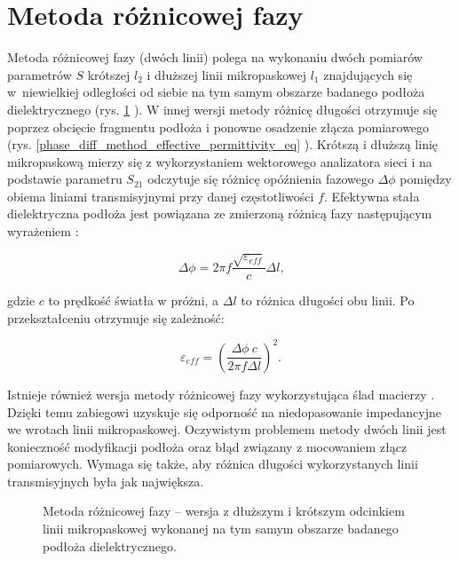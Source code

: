 \section{Metoda różnicowej fazy}

Metoda różnicowej fazy (dwóch linii) \cite{cite:two_lines_method} polega na wykonaniu dwóch pomiarów parametrów $S$ krótszej $l_2$ i dłuższej linii mikropaskowej $l_1$ znajdujących się w~niewielkiej odległości od siebie na tym samym obszarze badanego podłoża dielektrycznego (rys. \ref{fig:phase_difference_method_main} \cite{cite:doktorat}). W innej wersji metody różnicę długości otrzymuje się poprzez obcięcie fragmentu podłoża i ponowne osadzenie złącza pomiarowego (rys. \ref{phase_diff_method_effective_permittivity_eq} \cite{cite:doktorat}). Krótszą i dłuższą linię mikropaskową mierzy się z wykorzystaniem wektorowego analizatora sieci i na podstawie parametru $S_{21}$ odczytuje się różnicę opóźnienia fazowego $\Delta\phi$ pomiędzy obiema liniami transmisyjnymi przy danej częstotliwości $f$. Efektywna stała dielektryczna podłoża jest powiązana ze zmierzoną różnicą fazy następującym wyrażeniem \cite{cite:two_lines_method}:

 \begin{equation}
        \Delta\phi = 2\pi f\frac{\sqrt{\varepsilon_{eff}}}{c}\Delta l \text{,}
 \end{equation}
 
\noindent gdzie $c$ to prędkość światła w próżni, a $\Delta l$ to różnica długości obu linii. Po przekształceniu otrzymuje się zależność:

 \begin{equation}
\label{phase_diff_method_effective_permittivity_eq}
 \varepsilon_{eff} = \left( \frac{\Delta \phi \: c}{2 \pi f \Delta l} \right) ^2 \text{.}
 \end{equation}

Istnieje również wersja metody różnicowej fazy wykorzystująca ślad macierzy \cite{cite:two_lines_method_trace}. Dzięki temu zabiegowi uzyskuje się odporność na niedopasowanie impedancyjne we wrotach linii mikropaskowej. Oczywistym problemem metody dwóch linii jest konieczność modyfikacji podłoża oraz błąd związany z mocowaniem złącz pomiarowych. Wymaga się także, aby różnica długości wykorzystanych linii transmisyjnych była jak największa.

 \begin{figure}[tbh!]
    \centering{}
    \caption{Metoda różnicowej fazy – wersja z dłuższym i krótszym odcinkiem linii mikropaskowej wykonanej na tym samym obszarze badanego podłoża dielektrycznego.}
\label{fig:phase_difference_method_main}
\end{figure}

